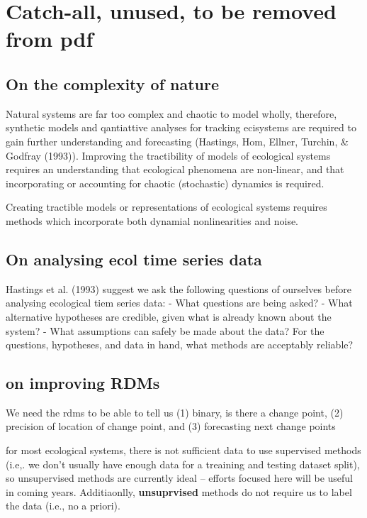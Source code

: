 \documentclass[12pt,twoside,openany]{reedthesis}
\begin{document}
\chapter*{Catch-all, unused, to be removed from
pdf}\label{catch-all-unused-to-be-removed-from-pdf}

\section{On the complexity of nature}\label{on-the-complexity-of-nature}

Natural systems are far too complex and chaotic to model wholly,
therefore, synthetic models and qantiattive analyses for tracking
ecisystems are required to gain further understanding and forecasting
(Hastings, Hom, Ellner, Turchin, \& Godfray (1993)). Improving the
tractibility of models of ecological systems requires an understanding
that ecological phenomena are non-linear, and that incorporating or
accounting for chaotic (stochastic) dynamics is required.

Creating tractible models or representations of ecological systems
requires methods which incorporate both dynamial nonlinearities and
noise.

\section{On analysing ecol time series
data}\label{on-analysing-ecol-time-series-data}

Hastings et al. (1993) suggest we ask the following questions of
ourselves before analysing ecological tiem series data: - What questions
are being asked? - What alternative hypotheses are credible, given what
is already known about the system? - What assumptions can safely be made
about the data? For the questions, hypotheses, and data in hand, what
methods are acceptably reliable?

\section{on improving RDMs}\label{on-improving-rdms}

We need the rdms to be able to tell us (1) binary, is there a change
point, (2) precision of location of change point, and (3) forecasting
next change points

for most ecological systems, there is not sufficient data to use
supervised methods (i.e,. we don't usually have enough data for a
treaining and testing dataset split), so unsupervised methods are
currently ideal -- efforts focused here will be useful in coming years.
Additiaonlly, \textbf{unsuprvised} methods do not require us to label
the data (i.e., no a priori).
\end{document}
